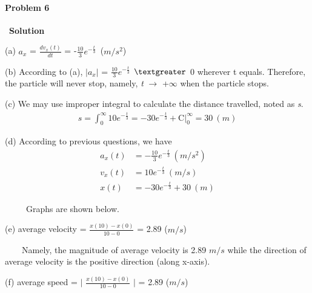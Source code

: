 \documentclass[12pt,a4paper]{article}
\begin{document}
\paragraph{\large \textbf{Problem 6}}~{\textbf{Solution}}
\vspace{2mm}
\par (a) $a_x$ = $\frac{dv_x(t)}{dt}$ = -$\frac{10}{3}e^{-\frac{t}{3}}$\ ($m/s^2$)
\par (b) According to (a), $\lvert$$a_x$$\rvert$ = $\frac{10}{3}e^{-\frac{t}{3}}$ $\textgreater$ 0 wherever t equals. Therefore, the particle will never stop, namely, \textit{t} $\rightarrow$ +$\infty$ when the particle stops.
\par (c) We may use improper integral to calculate the distance travelled, noted as \textit{s}.
\begin{align*}
s = \int_0^{\infty} 10e^{-\frac{t}{3}} = -30e^{-\frac{t}{3}} + \text{C} \vert_0^{\infty} = 30\ (m)
\end{align*}

\par (d) According to previous questions, we have 
\begin{align*}
a_x(t) &= -\frac{10}{3}e^{-\frac{t}{3}}\ (m/s^2)\\
v_x(t) &= 10e^{-\frac{t}{3}}\ (m/s)\\
x(t) &= -30e^{-\frac{t}{3}}+30\ (m)
\end{align*}
\par \ \ \ \ \ Graphs are shown below.
\begin{figure}[H]
    \centering
    \hspace{5mm}
    \hspace{5mm}
    \hspace{5mm}
\end{figure}
\par (e) average velocity = $\frac{x(10)-x(0)}{10-0}$ = 2.89 ($m/s$)
\par \ \ \ \ Namely, the magnitude of average velocity is 2.89 $m/s$ while the direction of average velocity is the positive direction (along x-axis).
\par (f) average speed = $\lvert$ $\frac{x(10)-x(0)}{10-0}$ $\rvert$ = 2.89 ($m/s$)
\end{document}
